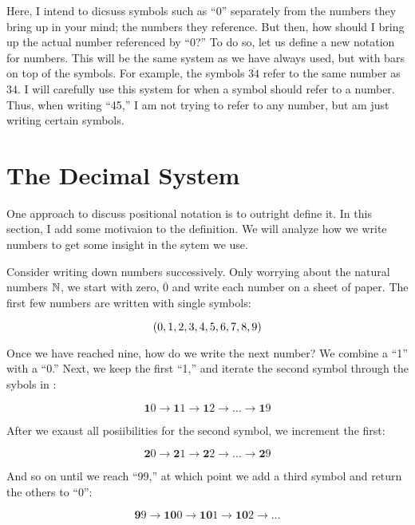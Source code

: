 \documentclass{article}
\begin{document}
	Here, I intend to dicsuss symbols such as ``0'' separately from the numbers they bring up in your mind; the numbers they reference. But then, how should I bring up the actual number referenced by ``0?'' To do so, let us define a new notation for numbers. This will be the same system as we have always used, but with bars on top of the symbols. For example, the symbols $\overline{34}$ refer to the same number as $34$. I will carefully use this system for when a symbol should refer to a number. Thus, when writing ``45,'' I am not trying to refer to any number, but am just writing certain symbols.
	
	\section{The Decimal System}
	One approach to discuss positional notation is to outright define it. In this section, I add some motivaion to the definition. We will analyze how we write numbers to get some insight in the sytem we use.
	
	Consider writing down numbers successively. Only worrying about the natural numbers $\mathbb{N}$, we start with zero, $\overline{0}$ and write each number on a sheet of paper. The first few numbers are written with single symbols:
	
	\begin{equation}\label{eq1}
		\pqty{0, 1, 2, 3, 4, 5, 6, 7, 8, 9}
	\end{equation}
	
	
	Once we have reached nine, how do we write the next number? We combine a ``1'' with a ``0.'' Next, we keep the first ``1,'' and iterate the second symbol through the sybols in :
	
	\begin{equation}\label{eq2}
		\bm{1}0\to \bm{1}1\to\bm{1}2\to\dots\to\bm{1}9
	\end{equation}
	
	After we exaust all posiibilities for the second symbol, we increment the first:
	
		\begin{equation}\label{eq3}
		\bm{2}0\to \bm{2}1\to\bm{2}2\to\dots\to\bm{2}9
		\end{equation}
	 
	And so on until we reach ``99,'' at which point we add a third symbol and return the others to ``0'':
	
		\begin{equation}\label{eq4}
		\bm{9}9\to\bm{10}0\to\bm{10}1\to\bm{10}2\to\dots
		\end{equation}
	 
\end{document}
